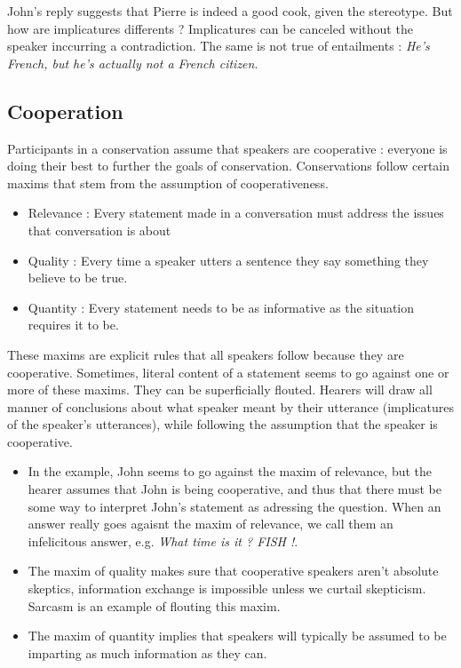\documentclass{cours}
\begin{document}
John's reply suggests that Pierre is indeed a good cook, given the stereotype. But how are implicatures differents ? Implicatures can be canceled without the speaker inccurring a contradiction. The same is not true of entailments : \textsl{He's French, but he's actually not a French citizen}.

\subsection{Cooperation}
\begin{proposition}
    Participants in a conservation assume that speakers are cooperative : everyone is doing their best to further the goals of conservation. Conservations follow certain maxims that stem from the assumption of cooperativeness.

\begin{itemize}
    \item Relevance : Every statement made in a conversation must address the issues that conversation is about
    \item Quality : Every time a speaker utters a sentence they say something they believe to be true.
    \item Quantity : Every statement needs to be as informative as the situation requires it to be. 
\end{itemize}
\end{proposition}

These maxims are explicit rules that all speakers follow because they are cooperative. Sometimes, literal content of a statement seems to go against one or more of these maxims. They can be superficially flouted. Hearers will draw all manner of conclusions about what speaker meant by their utterance (implicatures of the speaker's utterances), while following the assumption that the speaker is cooperative. 

\begin{itemize}
    \item In the example, John seems to go against the maxim of relevance, but the hearer assumes that John is being cooperative, and thus that there must be some way to interpret John's statement as adressing the question. When an answer really goes agaisnt the maxim of relevance, we call them an infelicitous answer, e.g. \textsl{What time is it ? FISH !}.
    \item The maxim of quality makes sure that cooperative speakers aren't absolute skeptics, information exchange is impossible unless we curtail skepticism. Sarcasm is an example of flouting this maxim. 
    \item The maxim of quantity implies that speakers will typically be assumed to be imparting as much information as they can.   
\end{itemize}
\end{document}
